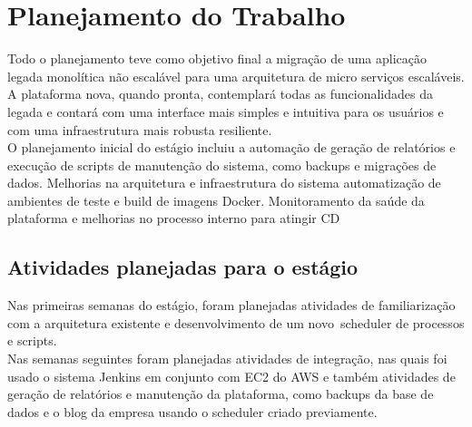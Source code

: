 \chapter{Planejamento do Trabalho}\label{chap:atividadesPlanejadas}

Todo o planejamento teve como objetivo final a migração de uma aplicação legada monolítica não escalável para uma arquitetura de micro serviços escaláveis. A plataforma nova, quando pronta, contemplará todas as funcionalidades da legada e contará com uma interface mais simples e intuitiva para os usuários e com uma infraestrutura mais robusta resiliente.\\

O planejamento inicial do estágio incluiu a automação de geração de relatórios e execução de scripts de manutenção do sistema, como backups e migrações de dados. Melhorias na arquitetura e infraestrutura do sistema automatização de ambientes de teste e build de imagens \gls{Docker}. Monitoramento da saúde da plataforma e melhorias no processo interno para atingir \gls{CD}\\


\section{Atividades planejadas para o estágio}



Nas primeiras semanas do estágio, foram planejadas atividades de familiarização com a arquitetura existente e desenvolvimento de um novo~\gls{scheduler} de processos e scripts.\\

Nas semanas seguintes foram planejadas atividades de integração, nas quais foi usado o sistema \gls{Jenkins} em conjunto com \gls{EC2} do \gls{AWS} e também atividades de geração de relatórios e manutenção da plataforma, como backups da base de dados e o blog da empresa usando o \gls{scheduler} criado previamente.

